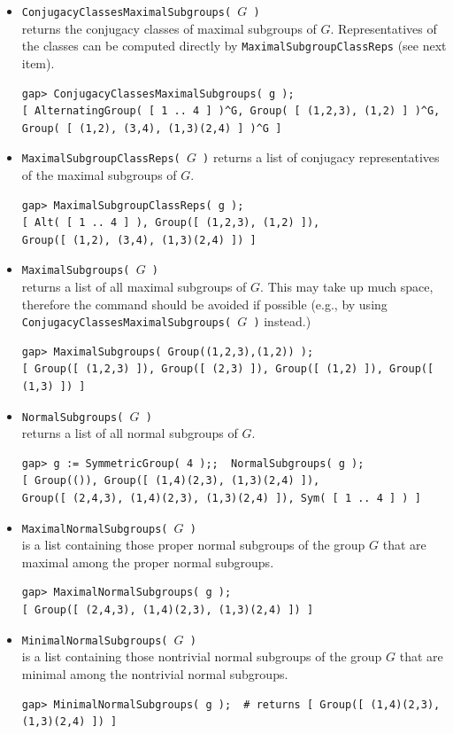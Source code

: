 \documentclass[11pt]{amsart}
\theoremstyle{plain}
\newcommand{\subsectionspace}{~\\[-6pt]}
\newcommand{\codesize}{\footnotesize}
\newcommand{\<}{\ensuremath{\langle}}
\renewcommand{\>}{\ensuremath{\rangle}}
\begin{document}
\begin{itemize}
\item {\tt ConjugacyClassesMaximalSubgroups( $G$ )}\\
returns the conjugacy classes of maximal subgroups of $G$. Representatives of the
classes can be computed directly by {\tt MaximalSubgroupClassReps} (see next item).
{\codesize
\begin{verbatim}
gap> ConjugacyClassesMaximalSubgroups( g );
[ AlternatingGroup( [ 1 .. 4 ] )^G, Group( [ (1,2,3), (1,2) ] )^G,
Group( [ (1,2), (3,4), (1,3)(2,4) ] )^G ]
\end{verbatim}}

\item {\tt MaximalSubgroupClassReps( $G$ )}
returns a list of conjugacy representatives of the maximal subgroups of $G$.
{\codesize
\begin{verbatim}
gap> MaximalSubgroupClassReps( g );
[ Alt( [ 1 .. 4 ] ), Group([ (1,2,3), (1,2) ]),
Group([ (1,2), (3,4), (1,3)(2,4) ]) ]
\end{verbatim}}

\item {\tt MaximalSubgroups( $G$ )}\\
returns a list of all maximal subgroups of $G$. This may take up much space, therefore the command should
be avoided if possible (e.g., by using {\tt ConjugacyClassesMaximalSubgroups( $G$ )}
instead.)
{\codesize
\begin{verbatim}
gap> MaximalSubgroups( Group((1,2,3),(1,2)) );
[ Group([ (1,2,3) ]), Group([ (2,3) ]), Group([ (1,2) ]), Group([ (1,3) ]) ]
\end{verbatim}}

\item {\tt NormalSubgroups( $G$ )}\\
returns a list of all normal subgroups of $G$.
{\codesize
\begin{verbatim}
gap> g := SymmetricGroup( 4 );;  NormalSubgroups( g );
[ Group(()), Group([ (1,4)(2,3), (1,3)(2,4) ]),
Group([ (2,4,3), (1,4)(2,3), (1,3)(2,4) ]), Sym( [ 1 .. 4 ] ) ]
\end{verbatim}}

\item {\tt MaximalNormalSubgroups( $G$ )}\\
is a list containing those proper normal subgroups of the group $G$ that are maximal among the proper
normal subgroups.
{\codesize
\begin{verbatim}
gap> MaximalNormalSubgroups( g );
[ Group([ (2,4,3), (1,4)(2,3), (1,3)(2,4) ]) ]
\end{verbatim}}

\item {\tt MinimalNormalSubgroups( $G$ )}\\
is a list containing those nontrivial normal subgroups of the group $G$ that are minimal among the nontrivial
normal subgroups.
{\codesize
\begin{verbatim}
gap> MinimalNormalSubgroups( g );  # returns [ Group([ (1,4)(2,3), (1,3)(2,4) ]) ]
\end{verbatim}}
\end{itemize}
\subsectionspace
\end{document}
